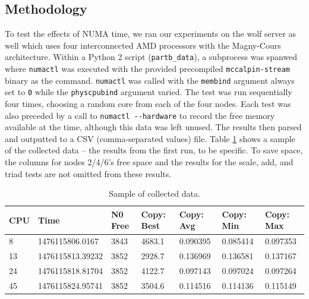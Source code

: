 \documentclass[11pt,twoside]{article}
\newcommand{\inlinecode}{\texttt}
\begin{document}
\subsection{Methodology}
To test the effects of NUMA time, we ran our experiments on the wolf server as well which uses four interconnected AMD processors with the Magny-Cours architecture. Within a Python 2 script (\inlinecode{partb\_data}), a subprocess was spanwed where \inlinecode{numactl} was executed with the provided precompiled \inlinecode{mccalpin-stream} binary as the command. \inlinecode{numactl} was called with the \inlinecode{membind} argument always set to \inlinecode{0} while the \inlinecode{physcpubind} argument varied. The test was run sequentially four times, choosing a random core from each of the four nodes. Each test was also preceded by a call to \inlinecode{numactl -{}-hardware} to record the free memory available at the time, although this data was left unused. The results then parsed and outputted to a CSV (comma-separated values) file. Table \ref{table:data} shows a sample of the collected data -- the results from the first run, to be specific. To save space, the columns for nodes 2/4/6's free space and the results for the scale, add, and triad tests are not omitted from these results.

\begin{table}[!htbp]
    \centering
    \renewcommand{\arraystretch}{1.2}
    \begin{tabular}{|l|l|l|l|l|l|l|}
    \hline
    \textbf{CPU} & \textbf{Time}    & \textbf{N0 Free} & \textbf{Copy: Best} & \textbf{Copy: Avg} & \textbf{Copy: Min} & \textbf{Copy: Max} \\ \hline
    8            & 1476115806.0167  & 3843             & 4683.1              & 0.090395           & 0.085414           & 0.097353           \\ \hline
    13           & 1476115813.39232 & 3852             & 2928.7              & 0.136969           & 0.136581           & 0.137167           \\ \hline
    24           & 1476115818.81704 & 3852             & 4122.7              & 0.097143           & 0.097024           & 0.097264           \\ \hline
    45           & 1476115824.95741 & 3852             & 3504.6              & 0.114516           & 0.114136           & 0.115149           \\ \hline
    \end{tabular}
    \caption{Sample of collected data.}
    \label{table:data}
\end{table}
\end{document}

